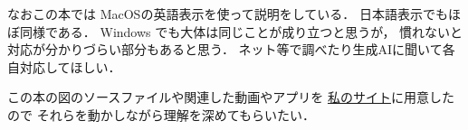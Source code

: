 なおこの本では MacOSの英語表示を使って説明をしている．
日本語表示でもほぼ同様である．
Windows でも大体は同じことが成り立つと思うが，
慣れないと対応が分かりづらい部分もあると思う．
ネット等で調べたり生成AIに聞いて各自対応してほしい．

この本の図のソースファイルや関連した動画やアプリを
\href{https://snow00two.github.io/mySite/}{私のサイト}に用意したので
それらを動かしながら理解を深めてもらいたい．
